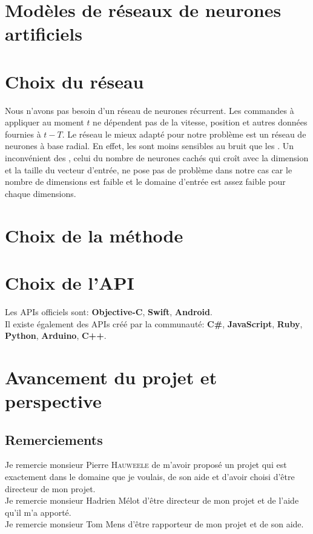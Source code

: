 \documentclass[12pt,a4paper,oneside, titlepage]{article}
\begin{document}


\tableofcontents
\newpage


\section{Modèles de réseaux de neurones artificiels}
\terminologie








\section{Choix du réseau}
Nous n'avons pas besoin d'un réseau de neurones récurrent. Les commandes à appliquer au moment $t$ ne dépendent pas de la vitesse, position et autres données fournies à $t-T$.
Le réseau le mieux adapté pour notre problème est un réseau de neurones à base radial.
En effet, les \rbf sont moins sensibles au bruit que les \mlp \cite{adversarial,Gauthier}.%
Un inconvénient des \rbf, celui du nombre de neurones cachés qui croît avec la dimension et la taille du vecteur d'entrée, ne pose pas de problème dans notre cas
car le nombre de dimensions est faible
et le domaine d'entrée est assez faible pour chaque dimensions.



\section{Choix de la méthode}

\section{Choix de l'API}
Les APIs officiels sont:\cite{SDKofficiels} \textbf{Objective-C}, \textbf{Swift}, \textbf{Android}.\\
Il existe également des APIs créé par la communauté:\cite{gosphero} \textbf{C\#}, \textbf{JavaScript}, \textbf{Ruby}, \textbf{Python}\cite{pythonAPI}, \textbf{Arduino}, \textbf{C++}\cite{cppAPI}.\\
\section{Avancement du projet et perspective}
\subsection*{Remerciements}
\noindent Je remercie monsieur Pierre \textsc{Hauweele} de m'avoir proposé un projet qui est exactement dans le domaine que je voulais, de son aide et d'avoir choisi d'être directeur de mon projet.\\

\noindent Je remercie monsieur Hadrien Mélot d'être directeur de mon projet et de l'aide qu'il m'a apporté.\\

\noindent Je remercie monsieur Tom Mens d'être rapporteur de mon projet et de son aide.\\



\end{document}
